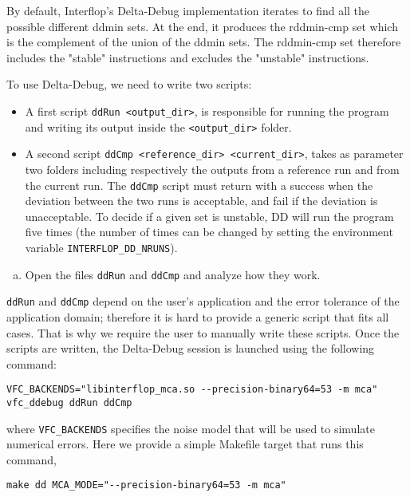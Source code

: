 By default, Interflop's Delta-Debug implementation iterates to find all the
possible different ddmin sets. At the end, it produces the rddmin-cmp set which
is the complement of the union of the ddmin sets. The rddmin-cmp set therefore
includes the "stable" instructions and excludes the "unstable" instructions.

To use Delta-Debug, we need to write two scripts: \begin{itemize}
  \item A first script \texttt{ddRun <output\_dir>}, is responsible for running the program and writing its output inside the \texttt{<output\_dir>} folder.
  \item A second script \texttt{ddCmp <reference\_dir> <current\_dir>}, takes as parameter two folders including respectively the outputs from a reference run and from the current run. The \texttt{ddCmp} script must return with a success when the deviation between the two runs is acceptable, and fail if the deviation is unacceptable.
    To decide if a given set is unstable, DD will run the program five times (the number of times can be changed by setting the environment variable \texttt{INTERFLOP\_DD\_NRUNS}).
\end{itemize}

\begin{question}
  \begin{enumerate}[(a)]
    \item Open the files \texttt{ddRun} and \texttt{ddCmp} and analyze how they work.
  \end{enumerate}
\end{question}

\texttt{ddRun} and \texttt{ddCmp} depend on the user's application and the error tolerance
of the application domain; therefore it is hard to provide a generic script that fits all cases. That is why we require the user to manually write these scripts.
Once the scripts are written, the Delta-Debug session is launched using the following command:

\begin{verbatim}
VFC_BACKENDS="libinterflop_mca.so --precision-binary64=53 -m mca" vfc_ddebug ddRun ddCmp
\end{verbatim}

where \texttt{VFC\_BACKENDS} specifies the noise model that will be used to
simulate numerical errors. Here we provide a simple Makefile target that
runs this command,
\begin{verbatim}
make dd MCA_MODE="--precision-binary64=53 -m mca"
\end{verbatim}

